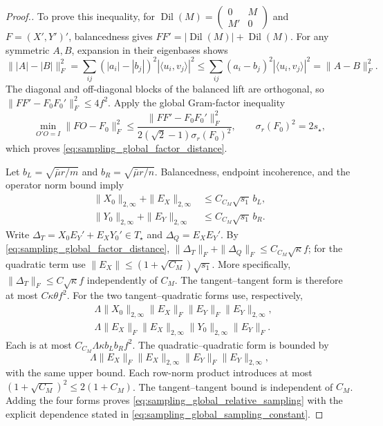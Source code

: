 \documentclass[numsec,webpdf,modern,large,namedate]{oup-authoring-template}
\theoremstyle{plain}
\theoremstyle{remark}
\newcommand{\M}{\bm{M}}
\newif\ifmarkchanges
\newenvironment{revision}{\begingroup\ifmarkchanges\color{red}\fi}{\endgroup}
\begin{document}
\begin{revision}
\begin{proof}[Proof.]
To prove this inequality, for $\operatorname{Dil}(M)=\left(\begin{smallmatrix}0&M\\M'&0\end{smallmatrix}\right)$
and $F=(X',Y')'$, balancedness gives
$FF'=|\operatorname{Dil}(M)|+\operatorname{Dil}(M)$.
For any symmetric $A,B$, expansion in their eigenbases shows
\[
 \||A|-|B|\|_F^2
 =\sum_{ij}(|a_i|-|b_j|)^2|\langle u_i,v_j\rangle|^2
 \le\sum_{ij}(a_i-b_j)^2|\langle u_i,v_j\rangle|^2
 =\|A-B\|_F^2.
\]
The diagonal and off-diagonal blocks of the balanced lift are orthogonal,
so $\|FF'-F_0F_0'\|_F^2\le4f^2$.
Apply the global Gram-factor inequality
\citep[Lemma~5.4]{tu2016procrustes}
\[
 \min_{O'O=I}\|FO-F_0\|_F^2
 \le\frac{\|FF'-F_0F_0'\|_F^2}
 {2(\sqrt2-1)\sigma_r(F_0)^2},
 \qquad \sigma_r(F_0)^2=2s_\star,
\]
which proves \eqref{eq:sampling_global_factor_distance}.

Let $b_L=\sqrt{\bar\mu r/m}$ and $b_R=\sqrt{\bar\mu r/n}$.
Balancedness, endpoint incoherence, and the operator norm bound imply
\begin{align*}
 \|X_0\|_{2,\infty}+\|E_X\|_{2,\infty}&\le C_{C_M}\sqrt{s_1}\,b_L,\\
 \|Y_0\|_{2,\infty}+\|E_Y\|_{2,\infty}&\le C_{C_M}\sqrt{s_1}\,b_R.
\end{align*}
Write
$\Delta_T=X_0E_Y'+E_XY_0'\in T_\star$ and
$\Delta_Q=E_XE_Y'$.  By \eqref{eq:sampling_global_factor_distance},
$\|\Delta_T\|_F+\|\Delta_Q\|_F\le C_{C_M}\sqrt\kappa f$;
for the quadratic term use
$\|E_X\|\le(1+\sqrt{C_M})\sqrt{s_1}$.
More specifically, $\|\Delta_T\|_F\le C\sqrt\kappa f$ independently of $C_M$.
The tangent--tangent form is therefore at most $C\kappa\theta f^2$.
For the two tangent--quadratic forms use, respectively,
\begin{align*}
 &\Lambda\|X_0\|_{2,\infty}\|E_X\|_F
                  \|E_Y\|_F\|E_Y\|_{2,\infty},\\
 &\Lambda\|E_X\|_F\|E_X\|_{2,\infty}
                  \|Y_0\|_{2,\infty}\|E_Y\|_F.
\end{align*}
Each is at most $C_{C_M}\Lambda\kappa b_Lb_R f^2$.
The quadratic--quadratic form is bounded by
\[
 \Lambda\|E_X\|_F\|E_X\|_{2,\infty}
 \|E_Y\|_F\|E_Y\|_{2,\infty},
\]
with the same upper bound.
Each row-norm product introduces at most $(1+\sqrt{C_M})^2\le2(1+C_M)$.
The tangent--tangent bound is independent of $C_M$.
Adding the four forms proves \eqref{eq:sampling_global_relative_sampling} with the
explicit dependence stated in \eqref{eq:sampling_global_sampling_constant}.


\end{proof}
\end{revision}
\end{document}
